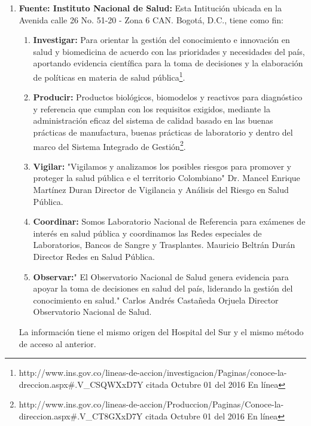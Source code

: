 \documentclass[a4paper,openright,12pt]{book}
\theoremstyle{definition}
\theoremstyle{remark}
\begin{document}
\begin{enumerate}
    \item \textbf{Fuente: Instituto Nacional de Salud:} Esta Intitución ubicada en la Avenida calle 26 No. 51-20 - Zona 6 CAN. Bogotá, D.C., tiene como fin:
    \begin{enumerate}
		\item \textbf{Investigar:} Para orientar la gestión del conocimiento e innovación en salud y biomedicina de acuerdo con las prioridades y necesidades del país, aportando evidencia científica para la toma de decisiones y la elaboración de políticas en materia de salud pública\footnote{http://www.ins.gov.co/lineas-de-accion/investigacion/Paginas/conoce-la-dreccion.aspx\#.V\_CSQWXxD7Y citada Octubre 01 del 2016 En línea}.  
        \item \textbf{Producir:}  Productos biológicos, biomodelos y reactivos para diagnóstico y referencia que cumplan con los requisitos exigidos, mediante la administración eficaz del sistema de calidad basado en las buenas prácticas de manufactura, buenas prácticas de laboratorio y dentro del marco del Sistema Integrado de Gestión\footnote{http://www.ins.gov.co/lineas-de-accion/Produccion/Paginas/Conoce-la-direccion.aspx\#.V\_CT8GXxD7Y citada Octubre 01 del 2016 En línea}.
        \item \textbf{Vigilar: } "Vigilamos y analizamos los posibles riesgos para promover y proteger la salud pública e el territorio Colombiano" Dr. Mancel Enrique Martínez Duran
Director de Vigilancia y Análisis del Riesgo en Salud Pública.
		\item \textbf{Coordinar:} Somos Laboratorio Nacional de Referencia para exámenes de interés en salud pública y coordinamos las Redes especiales de Laboratorios, Bancos de Sangre y Trasplantes. Mauricio Beltrán Durán Director Redes en Salud Pública.
        \item \textbf{Observar:}" El Observatorio Nacional de Salud genera evidencia para apoyar la toma de decisiones en salud del país, liderando la gestión del conocimiento en salud." Carlos Andrés Castañeda Orjuela Director Observatorio Nacional de Salud.
	\end{enumerate}
    La información tiene el mismo origen del Hospital del Sur y el mismo método de acceso al anterior.
\end{enumerate}
        
\end{document}
